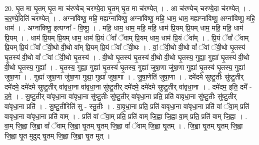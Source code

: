 \documentclass[17pt]{extarticle}
\begin{document}
20. घृ॒त मा घृ॒तम् घृ॒त मा च॑रण्येच् चरण्ये॒दा घृ॒तम् घृ॒त मा च॑रण्येत् । . आ च॑रण्येच् चरण्ये॒दा च॑रण्येत् । . च॒र॒ण्ये॒दिति॑ चरण्येत् । . अग्ना॑विष्णू॒ महि॒ मह्यग्ना॑विष्णू॒ अग्ना॑विष्णू॒ महि॒ धाम॒ धाम॒ मह्यग्ना॑विष्णू॒ अग्ना॑विष्णू॒ महि॒ धाम॑ । . अग्ना॑विष्णू॒ इत्यग्ना᳚ - वि॒ष्णू॒ । . महि॒ धाम॒ धाम॒ महि॒ महि॒ धाम॑ प्रि॒यम् प्रि॒यम् धाम॒ महि॒ महि॒ धाम॑ प्रि॒यम् । . धाम॑ प्रि॒यम् प्रि॒यम् धाम॒ धाम॑ प्रि॒यं ॅवां᳚ ॅवाम् प्रि॒यम् धाम॒ धाम॑ प्रि॒यं ॅवा᳚म् । . प्रि॒यं ॅवां᳚ ॅवाम् प्रि॒यम् प्रि॒यं ॅवां᳚ ॅवी॒थो वी॒थो वा᳚म् प्रि॒यम् प्रि॒यं ॅवां᳚ ॅवी॒थः । . वां॒ ॅवी॒थो वी॒थो वां᳚ ॅवां ॅवी॒थो घृ॒तस्य॑ घृ॒तस्य॑ वी॒थो वां᳚ ॅवां ॅवी॒थो घृ॒तस्य॑ । . वी॒थो घृ॒तस्य॑ घृ॒तस्य॑ वी॒थो वी॒थो घृ॒तस्य॒ गुह्या॒ गुह्या॑ घृ॒तस्य॑ वी॒थो वी॒थो घृ॒तस्य॒ गुह्या᳚ । . घृ॒तस्य॒ गुह्या॒ गुह्या॑ घृ॒तस्य॑ घृ॒तस्य॒ गुह्या॑ जुषा॒णा जु॑षा॒णा गुह्या॑ घृ॒तस्य॑ घृ॒तस्य॒ गुह्या॑ जुषा॒णा । . गुह्या॑ जुषा॒णा जु॑षा॒णा गुह्या॒ गुह्या॑ जुषा॒णा । . जु॒षा॒णेति॑ जुषा॒णा । . दमे॑दमे सुष्टु॒तीः सु॑ष्टु॒तीर् दमे॑दमे॒ दमे॑दमे सुष्टु॒तीर् वा॑वृधा॒ना वा॑वृधा॒ना सु॑ष्टु॒तीर् दमे॑दमे॒ दमे॑दमे सुष्टु॒तीर् वा॑वृधा॒ना । . दमे॑दम॒ इति॒ दमे᳚ - द॒मे॒ । . सु॒ष्टु॒तीर् वा॑वृधा॒ना वा॑वृधा॒ना सु॑ष्टु॒तीः सु॑ष्टु॒तीर् वा॑वृधा॒ना प्रति॒ प्रति॑ वावृधा॒ना सु॑ष्टु॒तीः सु॑ष्टु॒तीर् वा॑वृधा॒ना प्रति॑ । . सु॒ष्टु॒तीरिति॑ सु - स्तु॒तीः । . वा॒वृ॒धा॒ना प्रति॒ प्रति॑ वावृधा॒ना वा॑वृधा॒ना प्रति॑ वां ॅवा॒म् प्रति॑ वावृधा॒ना वा॑वृधा॒ना प्रति॑ वाम् । . प्रति॑ वां ॅवा॒म् प्रति॒ प्रति॑ वाम् जि॒ह्वा जि॒ह्वा वा॒म् प्रति॒ प्रति॑ वाम् जि॒ह्वा । . वा॒म् जि॒ह्वा जि॒ह्वा वां᳚ ॅवाम् जि॒ह्वा घृ॒तम् घृ॒तम् जि॒ह्वा वां᳚ ॅवाम् जि॒ह्वा घृ॒तम् । . जि॒ह्वा घृ॒तम् घृ॒तम् जि॒ह्वा जि॒ह्वा घृ॒त मुदुद् घृ॒तम् जि॒ह्वा जि॒ह्वा घृ॒त मुत् । \newline
\end{document}
